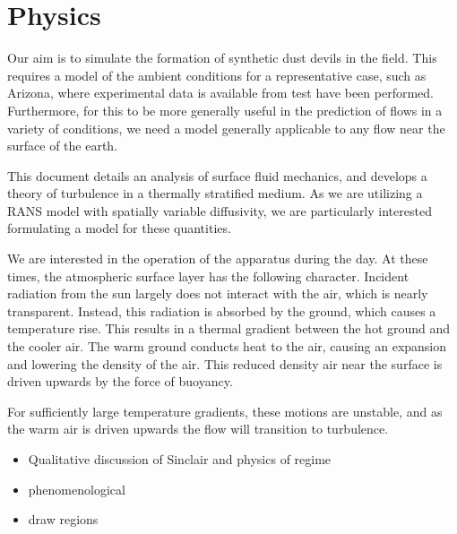 \section{Physics}


Our aim is to simulate the formation of synthetic dust devils in the field. This requires 
a model of the ambient conditions for a representative case, such as Arizona, where 
experimental data is available from test have been performed. Furthermore, for this to be 
more generally useful in the prediction of flows in a variety of conditions, we need a model 
generally applicable to any flow near the surface of the earth. 

This document details an analysis of surface fluid mechanics, and
develops a theory of turbulence in a thermally stratified medium. As we
are utilizing a RANS model with spatially variable diffusivity, we are
particularly interested formulating a model for these quantities. 

We are interested in the operation of the apparatus during the day. 
At these times, the atmospheric surface layer has the following character. 
Incident radiation from the sun largely does not interact with the
air, which is nearly transparent. Instead, this radiation is absorbed by
the ground, which causes a temperature rise. This results in a thermal
gradient between the hot ground and the cooler air. The warm ground
conducts heat to the air, causing an expansion and lowering the density
of the air. This reduced density air near the surface is driven upwards
by the force of buoyancy.  

For sufficiently large temperature gradients, these motions are
unstable, and as the warm air is driven upwards the flow will transition
to turbulence. 

\begin{itemize}
\item Qualitative discussion of Sinclair and physics of regime
\item phenomenological 
\item draw regions
\end{itemize}
